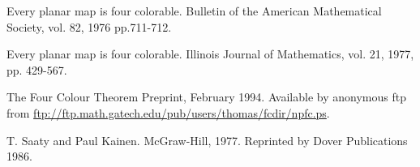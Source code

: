 \Ref

            {Every planar map is four colorable.}  
            {Bulletin of the American Mathematical Society,} 
            {vol. 82, 1976 pp.711-712.}

            {Every planar map is four colorable.}
            {Illinois Journal of Mathematics,}
            {vol. 21, 1977, pp. 429-567.}


             {The Four Colour Theorem}
             {Preprint,}{ February 1994. Available by anonymous ftp 
             from \url{ftp://ftp.math.gatech.edu/pub/users/thomas/fcdir/npfc.ps}.}

         {T. Saaty and Paul Kainen.}
         {McGraw-Hill, 1977. Reprinted by Dover Publications 1986.}
